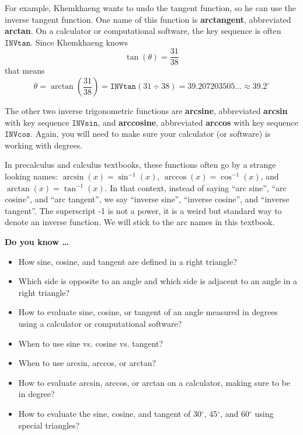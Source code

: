 For example, Khemkhaeng wants to undo the tangent function, so he can use the inverse tangent function. One name of this function is \textbf{arctangent}, abbreviated \textbf{arctan}.  On a calculator or computational software, the key sequence is often $\boxed{\texttt{INV}}\boxed{\texttt{tan}}$.
Since Khemkhaeng knows
$$\tan(\theta) = \frac{31}{38}$$
that means
$$\theta = \arctan\left(\frac{31}{38}\right) = \boxed{\texttt{INV}}\boxed{\texttt{tan}} ( 31 \div 38) = 39.207203505\ldots \approx 39.2^\circ$$

The other two inverse trigonometric functions are \textbf{arcsine}, abbreviated \textbf{arcsin} with key sequence $\boxed{\texttt{INV}}\boxed{\texttt{sin}}$, and \textbf{arccosine}, abbreviated \textbf{arccos} with key sequence $\boxed{\texttt{INV}}\boxed{\texttt{cos}}$. Again, you will need to make sure your calculator (or software) is working with degrees.

In precalculus and calculus textbooks, these functions often go by a strange looking names: $\arcsin(x) = \sin^{-1}(x)$, $\arccos(x) = \cos^{-1}(x)$, and $\arctan(x) = \tan^{-1}(x)$. In that context, instead of saying ``arc sine'', ``arc cosine'', and ``arc tangent'', we say ``inverse sine'', ``inverse cosine'', and ``inverse tangent''.  The superscript -1 is not a power, it is a weird but standard way to denote an inverse function.  We will stick to the arc names in this textbook.

 

\noindent \textbf{Do you know \ldots}

\begin{itemize}
\item How sine, cosine, and tangent are defined in a right triangle?
\item Which side is opposite to an angle and which side is adjacent to an angle in a right triangle?
\item How to evaluate sine, cosine, or tangent of an angle measured in degrees using a calculator or computational software?
\item When to use sine vs. cosine vs. tangent?
\item When to use arcsin, arccos, or arctan?
\item How to evaluate arcsin, arccos, or arctan on a calculator, making sure to be in degree?
\item How to evaluate the sine, cosine, and tangent of 30$^\circ$, 45$^\circ$, and 60$^\circ$ using special triangles?
  
\end{itemize}

